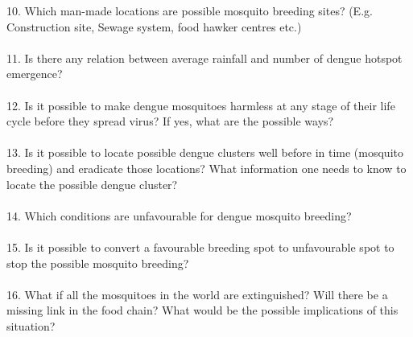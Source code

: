 \documentclass[11pt]{exam}
\begin{document}
10. Which man-made locations are possible mosquito breeding sites? (E.g. Construction site, Sewage system, food hawker centres etc.)\\ \\
11. Is there any relation between average rainfall and number of dengue hotspot emergence? \\ \\
12. Is it possible to make dengue mosquitoes harmless at any stage of their life cycle before they spread virus? If yes, what are the possible ways?\\ \\
13. Is it possible to locate possible dengue clusters well before in time (mosquito breeding) and eradicate those locations? What information one needs to know to locate the possible dengue cluster?\\ \\
14. Which conditions are unfavourable for dengue mosquito breeding? \\ \\
15. Is it possible to convert a favourable breeding spot to unfavourable spot to stop the possible mosquito breeding? \\ \\
16. What if all the mosquitoes in the world are extinguished? Will there be a missing link in the food chain? What would be the possible implications of this situation? \\ \\
\end{document}
